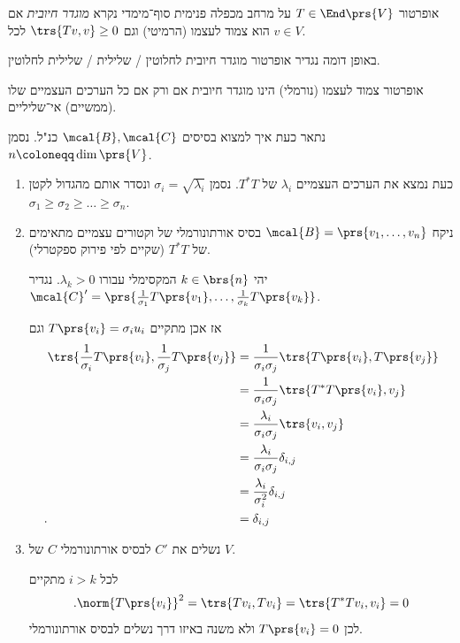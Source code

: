 \documentclass[a4paper,10pt,twoside,openany]{book}
\begin{document}
\begin{definition}
אופרטור
$T \in \End\prs{V}$
על מרחב מכפלה פנימית סוף־מימדי נקרא
\emph{מוגדר חיובית}
אם הוא צמוד לעצמו (הרמיטי) וגם
$\trs{Tv, v} \geq 0$
לכל
$v \in V$.
\end{definition}

\begin{remark}
באופן דומה נגדיר אופרטור מוגדר חיובית לחלוטין%
\slash%
שלילית%
\slash
שלילית לחלוטין.
\end{remark}

\begin{proposition}
אופרטור צמוד לעצמו (נורמלי) הינו מוגדר חיובית אם ורק אם כל הערכים העצמיים שלו (ממשיים) אי־שליליים.
\end{proposition}

\newpage

נתאר כעת איך למצוא בסיסים
$\mcal{B},\mcal{C}$
כנ"ל.
נסמן
$n \coloneqq \dim \prs{V}$.

\begin{enumerate}
\item
כעת נמצא את הערכים העצמיים $\lambda_i$ של $T^* T$. נסמן
$\sigma_i = \sqrt{\lambda_i}$
ונסדר אותם מהגדול לקטן
$\sigma_1 \geq \sigma_2 \geq \ldots \geq \sigma_n$.

\item
ניקח
$\mcal{B} = \prs{v_1, \ldots, v_n}$
בסיס אורתונורמלי של וקטורים עצמיים מתאימים של
$T^* T$
(שקיים לפי פירוק ספקטרלי).

יהי
$k \in \brs{n}$
המקסימלי עבורו
$\lambda_k > 0$.
נגדיר
$\mcal{C}' = \prs{\frac{1}{\sigma_1} T\prs{v_1}, \ldots, \frac{1}{\sigma_k} T\prs{v_k}}$.

אז אכן מתקיים
$T\prs{v_i} = \sigma_i u_i$
וגם
\begin{align*}
\trs{\frac{1}{\sigma_i} T\prs{v_i}, \frac{1}{\sigma_j} T\prs{v_j}}
&=
\frac{1}{\sigma_i \sigma_j} \trs{T\prs{v_i}, T\prs{v_j}}
\\&=
\frac{1}{\sigma_i \sigma_j} \trs{T^* T\prs{v_i}, v_j}
\\&=
\frac{\lambda_i}{\sigma_i \sigma_j} \trs{v_i, v_j}
\\&=
\frac{\lambda_i}{\sigma_i \sigma_j} \delta_{i,j}
\\&=
\frac{\lambda_i}{\sigma_i^2} \delta_{i,j}
\\ \text{.} \hphantom{\trs{\frac{1}{\sigma_i} T\prs{v_i}, \frac{1}{\sigma_j} T\prs{v_j}}} &=
\delta_{i,j}
\end{align*}

\item
נשלים את
$C'$
לבסיס אורתונורמלי
$C$
של
$V$.

לכל
$i > k$
מתקיים
\[\text{.} \norm{T\prs{v_i}}^2 = \trs{Tv_i, Tv_i} = \trs{T^* T v_i, v_i} = 0\]
לכן
$T\prs{v_i} = 0$
ולא משנה באיזו דרך נשלים לבסיס אורתונורמלי.
\end{enumerate}
\end{document}
